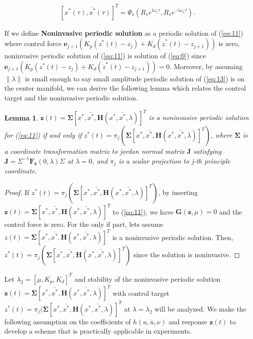 \documentclass[openacc]{rsproca_new}%
\def\vec#1{\ensuremath{\mathbf{#1}}}
\newcommand{\Eref}[1]{(\ref{#1})}
\newtheorem{lemma}{\bf Lemma}[section]
\begin{document}
\begin{align}\label{eq:16}
    [x^*(\tau),\bar {x^*}(\tau)]^T=\Psi_1(R_1e^{\textrm{i}\omega_1 \tau},R_1e^{-\textrm{i}\omega_1 \tau}).
\end{align}

\noindent If we define \textbf{Noninvasive periodic solution} as a periodic solution of \Eref{eq:11} where control force $\vec{e}_{j+1}(K_p(z^*(t)-z_j)+K_d(\dot z^*(t)-z_{j+1}))$ is zero, noninvasive periodic solution of \Eref{eq:11} is solution of \Eref{eq:0} since $\vec{e}_{j+1}(K_p(z^*(t)-z_j)+K_d(\dot z^*(t)-z_{j+1}))=0$. Moreover, by assuming $\| \lambda \|$ is small enough to say small amplitude periodic solution of \Eref{eq:13} is on the center manifold, we can derive the following lemma which relates the control target and the noninvasive periodic solution.

\begin{lemma}\label{l1}
$\vec{z}(t)=\vec{\Sigma}[x^*,\bar {x^*},\vec H(x^*,\bar {x^*},\lambda)]^T$ is a noninvasive periodic solution for \Eref{eq:11} if and only if $z^*(t)=\pi_j (\vec{\Sigma}[x^*,\bar {x^*},\vec H(x^*,\bar {x^*},\lambda)]^T)$,
where $\vec{\Sigma}$ is a coordinate transformation matrix to jordan normal matrix $\vec{J}$ satisfying $\vec{J}=\Sigma^{-1}\vec{F}_\vec{z}(0,\lambda) \Sigma$ at $\lambda=0$, and $\pi_j$ is a scalar projection to j-th principle coordinate.
\end{lemma}

\begin{proof}
If $z^*(t)=\pi_j (\vec{\Sigma}[x^*,\bar {x^*},\vec H(x^*,\bar {x^*},\lambda)]^T)$, by inserting $\vec z(t)=\vec{\Sigma}[x^*,\bar {x^*},\vec H(x^*,\bar {x^*},\lambda)]^T$ to \Eref{eq:11}, we have $\vec{G}(\vec{z},\mu)=0$ and the control force is zero. For the only if part, lets assume $z(t)=\vec{\Sigma}[x^*,\bar {x^*},\vec H(x^*,\bar {x^*},\lambda)]^T$ is a noninvasive periodic solution. Then, $z^*(t)=\pi_j (\vec{\Sigma}[x^*,\bar {x^*},\vec H(x^*,\bar {x^*},\lambda)]^T)$ since the solution is noninvasive.
\end{proof}

\noindent Let $\lambda_2=[\mu,K_p,K_d]^T$ and stability of the noninvasive periodic solution $\vec{z}(t)=\vec{\Sigma}[x^*,\bar {x^*},\vec H(x^*,\bar {x^*},\lambda)]^T$ with control target $z^*(t)=\pi_j (\vec{\Sigma}[x^*,\bar {x^*},\vec H(x^*,\bar {x^*},\lambda)]^T$  at $\lambda=\lambda_2$ will be analyzed. We make the following assumption on the coefficients of $h(u,\bar u,\nu)$ and response $\vec{z}(t)$ to develop a scheme that is practically applicable in experiments.
\end{document}
